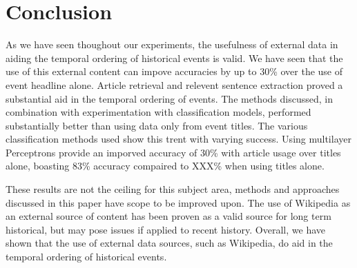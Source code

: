 \documentclass[bsc,frontabs,twoside,singlespacing,parskip,deptreport]{infthesis}     %
\begin{document}


\chapter{Conclusion}
As we have seen thoughout our experiments, the usefulness of external data in aiding the temporal ordering
of historical events is valid. We have seen that the use of this external content can impove accuracies by up to
30\% over the use of event headline alone.
Article retrieval and relevent sentence extraction proved a substantial aid in the temporal ordering of events.
The methods discussed, in combination with experimentation with classification models, performed substantially better
than using data only from event titles.
The various classification methods used show this trent with varying success. Using multilayer Perceptrons provide an
imporved accuracy of 30\% with article usage over titles alone, boasting 83\% accuracy compaired to XXX\% when using titles
alone.


These results are not the ceiling for this subject area, methods and approaches discussed in this paper have scope
to be improved upon. The use of Wikipedia as an external source of content has been proven as a valid source for
long term historical, but may pose issues if applied to recent history. Overall, we have shown that the use of external
data sources, such as Wikipedia, do aid in the temporal ordering of historical events.


\end{document}
